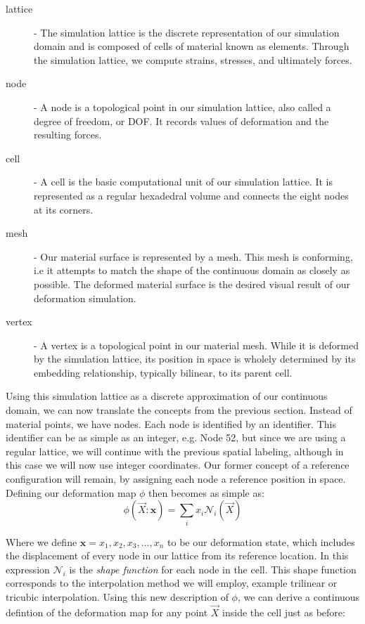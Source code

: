 \documentclass[12pt,oneside,letterpaper]{memoir}
\begin{document}
\begin{description}
\item[lattice] - The simulation lattice is the discrete representation
  of our simulation domain and is composed of cells of material known
  as elements. Through the simulation lattice, we compute strains,
  stresses, and ultimately forces.
\item[node] - A node is a topological point in our simulation lattice,
  also called a degree of freedom, or DOF. It records values of
  deformation and the resulting forces.
\item[cell] - A cell is the basic computational unit of our simulation
  lattice. It is represented as a regular hexadedral volume and
  connects the eight nodes at its corners.
\item[mesh] - Our material surface is represented by a mesh. This mesh
  is conforming, i.e it attempts to match the shape of the continuous
  domain as closely as possible. The deformed material surface is the
  desired visual result of our deformation simulation.
\item[vertex] - A vertex is a topological point in our material
  mesh. While it is deformed by the simulation lattice, its position
  in space is wholely determined by its embedding relationship,
  typically bilinear, to its parent cell.
\end{description}

Using this simulation lattice as a discrete approximation of our
continuous domain, we can now translate the concepts from the previous
section. Instead of material points, we have nodes. Each node is
identified by an identifier. This identifier can be as simple as an
integer, e.g. Node 52, but since we are using a regular lattice, we
will continue with the previous spatial labeling, although in this case we
will now use integer coordinates. Our former concept of a reference
configuration will remain, by assigning each node a reference position
in space. Defining our deformation map $\phi$ then becomes as
simple as:
\begin{equation}
  \label{equ:discretedeformationmap}
  \phi(\vec{X}:\mathbf x) = \sum_i x_i \mathcal N_i(\vec{X})
\end{equation}

Where we define $\mathbf x = {x_1, x_2, x_3, \ldots, x_n}$ to be our
deformation state, which includes the displacement of every node in
our lattice from its reference location. In this expression
$\mathcal N_i$ is the \textit{shape function} for each node in the
cell. This shape function corresponds to the interpolation method we
will employ, example trilinear or tricubic interpolation. Using this
new description of $\phi$, we can derive a continuous defintion of the
deformation map for any point $\vec{X}$ inside the cell just as
before:
\end{document}
